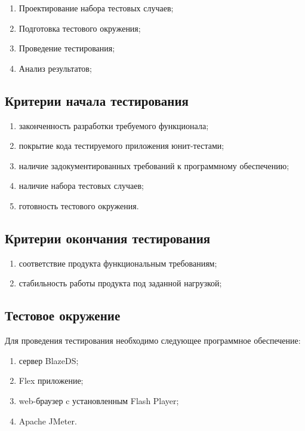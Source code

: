 \begin{enumerate}
\item Проектирование набора тестовых случаев;
\item Подготовка тестового окружения;
\item Проведение тестирования;
\item Анализ результатов;
\end{enumerate}

\subsection{Критерии начала тестирования}

\begin{enumerate}
\item законченность разработки требуемого функционала;
\item покрытие кода тестируемого приложения юнит-тестами;
\item наличие задокументированных требований к программному обеспечению;
\item наличие набора тестовых случаев;
\item готовность тестового окружения.
\end{enumerate}

\subsection{Критерии окончания тестирования}

\begin{enumerate}
\item соответствие продукта функциональным требованиям;
\item стабильность работы продукта под заданной нагрузкой;
\end{enumerate}

\subsection{Тестовое окружение}

Для проведения тестирования необходимо следующее программное обеспечение:

\begin{enumerate}
\item сервер BlazeDS;
\item Flex приложение;
\item web-браузер c установленным Flash Player;
\item Apache JMeter.
\end{enumerate}

